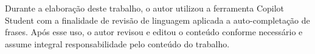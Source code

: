 \documentclass[	12pt, Times, openright, twoside, a4paper, english, brazil]{abntex2}
\begin{document}
Durante a elaboração deste trabalho, o autor utilizou a ferramenta Copilot Student com a finalidade de revisão de linguagem aplicada a auto-completação de frases. Após esse uso, o autor revisou e editou  o conteúdo conforme necessário e assume integral responsabilidade pelo conteúdo do trabalho.

\postextual





%
%














\end{document}
